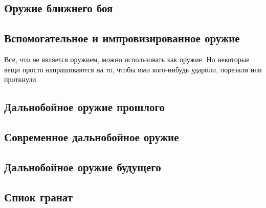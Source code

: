 \subsection{Оружие ближнего боя}

\subsection{Вспомогательное и импровизированное оружие}
Все, что не является оружием, можно использовать как оружие. Но некоторые вещи просто напрашиваются на то, чтобы ими кого-нибудь ударили, порезали или проткнули.

\subsection{Дальнобойное оружие прошлого}

\subsection{Современное дальнобойное оружие}

\subsection{Дальнобойное оружие будущего}


\subsection{Спиок гранат}
